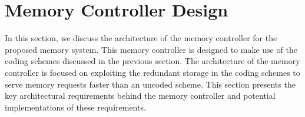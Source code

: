 \section{Memory Controller Design}
\label{sec:memcontrol}
In this section, we discuss the architecture of the memory controller for the proposed memory system. This memory controller is designed to make use of the coding schemes discussed in the previous section. The architecture of the memory controller is focused on exploiting the redundant storage in the coding schemes to serve memory requests faster than an uncoded scheme. This section presents the key architectural requirements behind the memory controller and potential implementations of these requirements.

